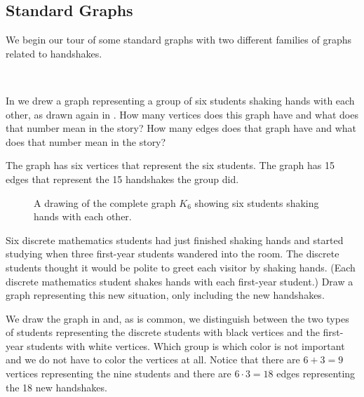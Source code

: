 
\newcommand{\substdgraphs}{Standard Graphs}
\subsection{\substdgraphs}
\label{sub_standard_graphs}

We begin our tour of some standard graphs with two different families of graphs related to handshakes.

\begin{exam} 
\label{exam_handshake_graphs}
~     
    \begin{apart}
        \item \label{part_hs_complete} In  we drew a graph representing a group of six students shaking hands with each other, as drawn again in .  How many vertices does this graph have and what does that number mean in the story? How many edges does that graph have and what does that number mean in the story?
            \begin{soln}
                The graph has six vertices that represent the six students.  The graph has 15 edges that represent the 15 handshakes the group did.
            \end{soln}

            \begin{figure}[hbtp]
                 \centering
                 
                 \caption{A drawing of the complete graph $K_6$ showing six students shaking hands with each other.}
                 \label{fig_K6_again}
             \end{figure}
        \item \label{part_hs_complete_bipartite} Six discrete mathematics students had just finished shaking hands and started studying when three first-year students wandered into the room.  The discrete students thought it would be polite to greet each visitor by shaking hands.  (Each discrete mathematics student shakes hands with each first-year student.) Draw a graph representing this new situation, only including the new handshakes.
             \begin{soln}
                 We draw the graph in  and, as is common, we distinguish between the two types of students representing the discrete students with black vertices and the first-year students with white vertices.  Which group is which color is not important and we do not have to color the vertices at all.  Notice that there are $6+3=9$ vertices representing the nine students and there are $6\cdot3=18$ edges representing the 18 new handshakes.
             \end{soln}


\end{apart}
\end{exam}
